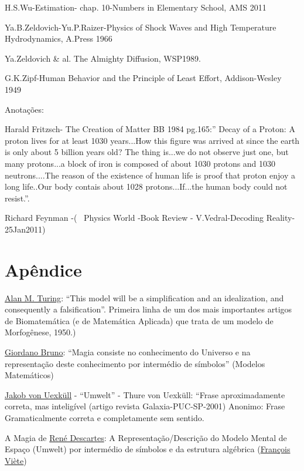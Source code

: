 H.S.Wu-Estimation- chap. 10-Numbers in Elementary School, AMS 2011

Ya.B.Zeldovich-Yu.P.Raizer-Physics of Shock Waves and High Temperature Hydrodynamics, A.Press 1966

Ya.Zeldovich \& al. The Almighty Diffusion, WSP1989.

G.K.Zipf-Human Behavior and the Principle of Least Effort, Addison-Wesley 1949

Anotações:

Harald Fritzsch- The Creation of Matter BB 1984 pg.165:'' Decay of a Proton: A proton lives for at least 1030 years...How this figure was arrived at since the earth is only about 5 billion years old? The thing is...we do not observe just one, but many protons...a block of iron is composed of about 1030 protons and 1030 neutrons....The reason of the existence of human life is proof that proton enjoy a long
life..Our body contais about 1028 protons...If...the human body could not resist.''.

Richard Feynman -( ~Physics World -Book Review - V.Vedral-Decoding Reality-25Jan2011)



\section{Apêndice}


    \href{https://pt.wikipedia.org/wiki/Alan_Turing}{Alan M. Turing}: ``This model will be a simplification and an idealization, and consequently a falsification''. Primeira linha de um dos mais importantes artigos de Biomatemática (e de Matemática Aplicada) que trata de um modelo de Morfogênese, 1950.)

    \href{https://pt.wikipedia.org/wiki/Giordano_Bruno}{Giordano Bruno}: ``Magia consiste no conhecimento do Universo e na representação deste conhecimento por intermédio de símbolos'' (Modelos Matemáticos)

    \href{https://pt.wikipedia.org/wiki/Jakob_von_Uexk\%C3\%BCll}{Jakob von Uexküll} - ``Umwelt'' - Thure von Uexküll: ``Frase aproximadamente correta, mas inteligível (artigo revista Galaxia-PUC-SP-2001) Anonimo: Frase Gramaticalmente correta e completamente sem sentido.

    A Magia de \href{https://pt.wikipedia.org/wiki/Ren\%C3\%A9_Descartes}{René Descartes}: A Representação/Descrição do Modelo Mental de Espaço (Umwelt) por intermédio de símbolos e da estrutura algébrica (\href{https://pt.wikipedia.org/wiki/Fran\%C3\%A7ois_Vi\%C3\%A8te}{François Viète})

